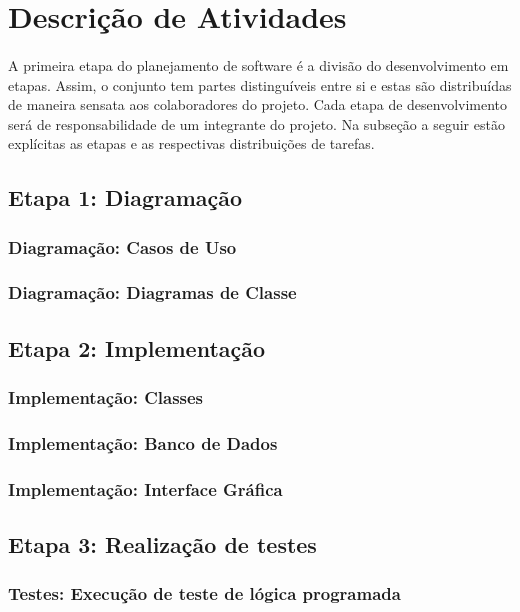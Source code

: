 \documentclass[12pt,a4paper]{article}
\begin{document}
		\section{Descrição de Atividades}
		\paragraph{} A primeira etapa do planejamento de software é a divisão do desenvolvimento em etapas. Assim, o conjunto tem partes distinguíveis entre si e estas são distribuídas de maneira sensata aos colaboradores do projeto. Cada etapa de desenvolvimento será de responsabilidade de um integrante do projeto. Na subseção a seguir estão explícitas as etapas e as respectivas distribuições de tarefas.
		\subsection{Etapa 1: Diagramação}
		\subsubsection{Diagramação: Casos de Uso}
		\subsubsection{Diagramação: Diagramas de Classe}
		\subsection{Etapa 2: Implementação}
		\subsubsection{Implementação: Classes}
		\subsubsection{Implementação: Banco de Dados}
		\subsubsection{Implementação: Interface Gráfica}
		\subsection{Etapa 3: Realização de testes}
		\subsubsection{Testes: Execução de teste de lógica programada}
\end{document}

